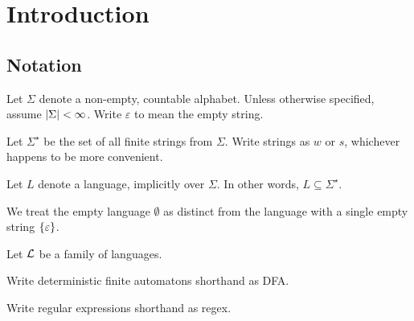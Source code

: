\section{Introduction}

\subsection{Notation}

Let \(\Sigma\) denote a non-empty, countable alphabet.
Unless otherwise specified, assume \(\left\lvert\Sigma\right\rvert < \infty\).
Write \(\varepsilon\) to mean the empty string.

Let \(\Sigma^\star\) be the set of all finite strings from \(\Sigma\).
Write strings as \(w\) or \(s\), whichever happens to be more convenient.

Let \(L\) denote a language, implicitly over \(\Sigma\).
In other words, \(L \subseteq \Sigma^\star\).

We treat the empty language \(\emptyset\) as distinct from
the language with a single empty string \(\left\{\varepsilon\right\}\).

Let \(\mathcal{L}\) be a family of languages.

Write deterministic finite automatons shorthand as DFA.

Write regular expressions shorthand as regex.

